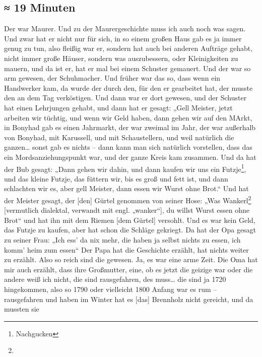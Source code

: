 \documentclass[ngerman,]{article}
\providecommand{\tightlist}{%
  \setlength{\itemsep}{0pt}\setlength{\parskip}{0pt}}
\begin{document}
\begin{multicols}{2}
\hypertarget{minuten-1}{%
\subsection{≈ 19 Minuten}\label{minuten-1}}

\begin{description}
\tightlist
\item[Käthe]
Der war Maurer. Und zu der Maurergeschichte muss ich auch noch was
sagen. Und zwar hat er nicht nur für sich, in so einem großen Haus gab
es ja immer genug zu tun, also fleißig war er, sondern hat auch bei
anderen Aufträge gehabt, nicht immer große Häuser, sondern was
auszubessern, oder Kleinigkeiten zu mauern, und da ist er, hat er mal
bei einem Schuster gemauert. Und der war so arm gewesen, der
Schuhmacher. Und früher war das so, dass wenn ein Handwerker kam, da
wurde der durch den, für den er gearbeitet hat, der musste den an dem
Tag verköstigen. Und dann war er dort gewesen, und der Schuster hat
einen Lehrjungen gehabt, und dann hat er gesagt: „Gell Meister, jetzt
arbeiten wir tüchtig, und wenn wir Geld haben, dann gehen wir auf den
MArkt, in Bonyhad gab es einen Jahrmarkt, der war zweimal im Jahr, der
war außerhalb von Bonyhad, mit Karussell, und mit Schaustellern, und
weil natürlich die ganzen\ldots{} sonst gab es nichts – dann kann man
sich natürlich vorstellen, dass das ein Mordsanziehungspunkt war, und
der ganze Kreis kam zusammen. Und da hat der Bub gesagt: „Dann gehen wir
dahin, und dann kaufen wir uns ein Futzje\footnote{Nachgucken}, und das
kleine Futzje, das füttern wir, bis es groß und fett ist, und dann
schlachten wir es, aber gell Meister, dann essen wir Wurst ohne Brot.“
Und hat der Meister gesagt, der {[}den{]} Gürtel genommen von seiner
Hose: „Was Wankerl\footnote{} {[}vermutlich dialektal, verwandt mit
engl. „wanker“{]}, du willst Wurst essen ohne Brot“ und hat ihn mit dem
Riemen {[}dem Gürtel{]} versohlt. Und es war kein Geld, das Futzje zu
kaufen, aber hat schon die Schläge gekriegt. Da hat der Opa gesagt zu
seiner Frau: „Ich ess' da nix mehr, die haben ja selbst nichts zu essen,
ich komm' heim zum essen“ Der Papa hat die Geschichte erzählt, hat
nichts weiter zu erzählt. Also so reich sind die gewesen. Ja, es war
eine arme Zeit. Die Oma hat mir auch erzählt, dass ihre Großmutter,
eine, ob es jetzt die geizige war oder die andere weiß ich nicht, die
sind rausgefahren, des muss\ldots{} die sind ja 1720 hingekommen, also
so 1790 oder vielleicht 1800 Anfang war es rum – rausgefahren und haben
im Winter hat es {[}das{]} Brennholz nicht gereicht, und da mussten sie

\end{description}
\end{multicols}
\end{document}
